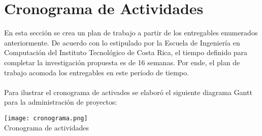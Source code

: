 \section{\textbf{Cronograma de Actividades}}
En esta secci\'on se crea un plan de trabajo a partir de los entregables enumerados anteriormente. De acuerdo con lo estipulado por la Escuela de Ingenier\'ia en Computaci\'on del Instituto Tecnol\'ogico de Costa Rica, el tiempo definido para completar la investigaci\'on propuesta es de 16 semanas. Por ende, el plan de trabajo acomoda los entregables en este per\'iodo de tiempo.
\\\\
Para ilustrar el cronograma de activades se elabor\'o el siguiente diagrama Gantt para la administraci\'on de proyectos:
\\
\begin{table}[ht]
\texttt{[image: cronograma.png]}\\
\caption{Cronograma de actividades}
\label{arm:tabla}
\begin{center}
\end{center}
\end{table}